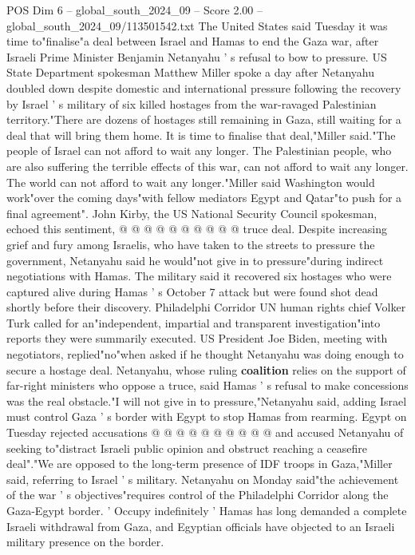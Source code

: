 \begin{textsample}{POS Dim 6 – global\_south\_2024\_09 – Score 2.00 – global\_south\_2024\_09/113501542.txt}  \label{ex:f6_pos_426}
The United States said Tuesday it was time to"finalise"a deal between Israel and Hamas to end the Gaza war, after Israeli Prime Minister Benjamin Netanyahu ' s refusal to bow to pressure.
US State Department spokesman Matthew Miller spoke a day after Netanyahu doubled down despite domestic and international pressure following the recovery by Israel ' s military of six killed hostages from the war-ravaged Palestinian territory."There are dozens of hostages still remaining in Gaza, still waiting for a deal that will bring them home.
It is time to finalise that deal,"Miller said."The people of Israel can not afford to wait any longer.
The Palestinian people, who are also suffering the terrible effects of this war, can not afford to wait any longer.
The world can not afford to wait any longer."Miller said Washington would work"over the coming days"with fellow mediators Egypt and Qatar"to push for a final agreement".
John Kirby, the US National Security Council spokesman, echoed this sentiment, @ @ @ @ @ @ @ @ @ @ truce deal.
Despite increasing grief and fury among Israelis, who have taken to the streets to pressure the government, Netanyahu said he would"not give in to pressure"during indirect negotiations with Hamas.
The military said it recovered six hostages who were captured alive during Hamas ' s October 7 attack but were found shot dead shortly before their discovery.
Philadelphi Corridor UN human rights chief Volker Turk called for an"independent, impartial and transparent investigation"into reports they were summarily executed.
US President Joe Biden, meeting with negotiators, replied"no"when asked if he thought Netanyahu was doing enough to secure a hostage deal.
Netanyahu, whose ruling \textbf{coalition} relies on the support of far-right ministers who oppose a truce, said Hamas ' s refusal to make concessions was the real obstacle."I will not give in to pressure,"Netanyahu said, adding Israel must control Gaza ' s border with Egypt to stop Hamas from rearming.
Egypt on Tuesday rejected accusations @ @ @ @ @ @ @ @ @ @ and accused Netanyahu of seeking to"distract Israeli public opinion and obstruct reaching a ceasefire deal"."We are opposed to the long-term presence of IDF troops in Gaza,"Miller said, referring to Israel ' s military.
Netanyahu on Monday said"the achievement of the war ' s objectives"requires control of the Philadelphi Corridor along the Gaza-Egypt border. ' Occupy indefinitely ' Hamas has long demanded a complete Israeli withdrawal from Gaza, and Egyptian officials have objected to an Israeli military presence on the border.

\end{textsample}
